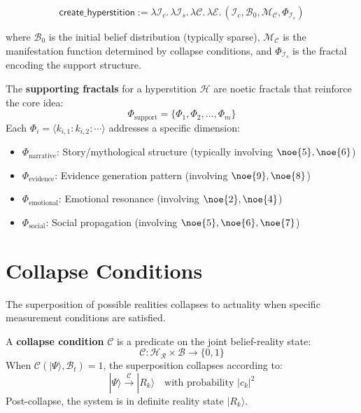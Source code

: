 \begin{equation}
\boxed{
\mathsf{create\_hyperstition} := \lambda \mathcal{I}_c.\, \lambda \mathcal{I}_s.\, \lambda \mathcal{C}.\, \lambda \mathcal{E}.\,
\left(\mathcal{I}_c, \mathcal{B}_0, \mathcal{M}_{\mathcal{C}}, \Phi_{\mathcal{I}_s}\right)
}
\end{equation}

where $\mathcal{B}_0$ is the initial belief distribution (typically sparse), $\mathcal{M}_{\mathcal{C}}$ is the manifestation function determined by collapse conditions, and $\Phi_{\mathcal{I}_s}$ is the fractal encoding the support structure.

\begin{definition}
\label{def:supporting-fractals}
The \textbf{supporting fractals} for a hyperstition $\mathcal{H}$ are noetic fractals that reinforce the core idea:
\[
\Phi_{\text{support}} = \{\Phi_1, \Phi_2, \ldots, \Phi_m\}
\]
Each $\Phi_i = \langle k_{i,1} : k_{i,2} : \cdots \rangle$ addresses a specific dimension:
\begin{itemize}
    \item $\Phi_{\text{narrative}}$: Story/mythological structure (typically involving $\noe{5}, \noe{6}$)
    \item $\Phi_{\text{evidence}}$: Evidence generation pattern (involving $\noe{9}, \noe{8}$)
    \item $\Phi_{\text{emotional}}$: Emotional resonance (involving $\noe{2}, \noe{4}$)
    \item $\Phi_{\text{social}}$: Social propagation (involving $\noe{5}, \noe{6}, \noe{7}$)
\end{itemize}
\end{definition}

\section{Collapse Conditions}
\label{sec:collapse-conditions}

The superposition of possible realities collapses to actuality when specific measurement conditions are satisfied.

\begin{definition}
\label{def:collapse-condition}
A \textbf{collapse condition} $\mathcal{C}$ is a predicate on the joint belief-reality state:
\[
\mathcal{C}: \mathcal{H}_{\mathcal{R}} \times \mathcal{B} \to \{0, 1\}
\]
When $\mathcal{C}(|\Psi\rangle, \mathcal{B}_t) = 1$, the superposition collapses according to:
\begin{equation}
\boxed{
|\Psi\rangle \xrightarrow{\mathcal{C}} |R_k\rangle \quad \text{with probability } |c_k|^2
}
\end{equation}
Post-collapse, the system is in definite reality state $|R_k\rangle$.
\end{definition}

